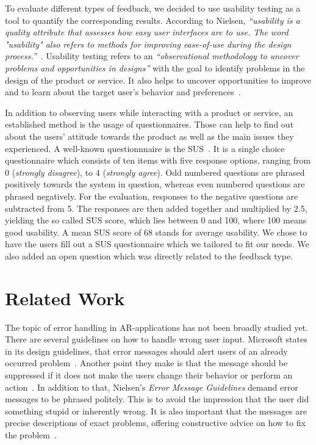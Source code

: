 \documentclass[manuscript]{acmart}
\begin{document}
		To evaluate different types of feedback, we decided to use usability testing as a tool to quantify the corresponding results. According to Nielsen, \textit{``usability is a quality attribute that assesses how easy user interfaces are to use. The word "usability" also refers to methods for improving ease-of-use during the design process.''}~\cite{Nielsen2012}. Usability testing refers to an \textit{``observational methodology to uncover problems and opportunities in designs''} with the goal to identify problems in the design of the product or service. It also helps to uncover opportunities to improve and to learn about the target user's behavior and preferences~\cite{Moran2019}.

		In addition to observing users while interacting with a product or service, an established method is the usage of questionnaires. Those can help to find out about the users' attitude towards the product as well as the main issues they experienced. A well-known questionnnaire is the \acf{SUS}~\cite{SUS2019}. It is a single choice questionnaire which consists of ten items with five response options, ranging from 0 (\emph{strongly disagree}), to 4 (\emph{strongly agree}). Odd numbered questions are phrased positively towards the system in question, whereas even numbered questions are phrased negatively. For the evaluation, responses to the negative questions are subtracted from 5. The responses are then added together and multiplied by 2.5, yielding the so called SUS score, which lies between 0 and 100, where 100 means good usability. A mean SUS score of 68 stands for average usability. We chose to have the users fill out a \ac{SUS} questionnaire which we tailored to fit our needs. We also added an open question which was directly related to the feedback type.

	\section{Related Work}\label{sec:relatedwork}
		The topic of error handling in \ac{AR}-applications has not been broadly studied yet. There are several guidelines on how to handle wrong user input. Microsoft states in its design guidelines, that error messages should alert users of an already occurred problem~\cite{Microsoft2018}. Another point they make is that the message should be suppressed if it does not make the users change their behavior or perform an action~\cite{Microsoft2018}. In addition to that, Nielsen's \textit{Error Message Guidelines} demand error messages to be phrased politely. This is to avoid the impression that the user did something stupid or inherently wrong. It is also important that the messages are precise descriptions of exact problems, offering constructive advice on how to fix the problem~\cite{Nielsen2001}.
\end{document}
